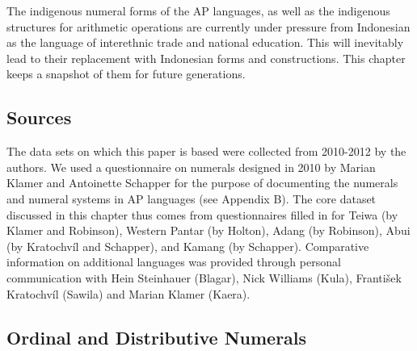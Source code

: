 The indigenous numeral forms of the AP languages, as well as the indigenous structures for arithmetic operations are currently under pressure from Indonesian as the language of interethnic trade and national education. This will inevitably lead to their replacement with Indonesian forms and constructions. This chapter keeps a snapshot of them for future generations. 

\subsection{Sources}
\label{sec:8:Sources}
The data sets on which this paper is based were collected from 2010-2012 by the authors. We used a questionnaire on numerals designed in 2010 by Marian Klamer and Antoinette Schapper for the purpose of documenting the numerals and numeral systems in AP languages (see Appendix B). The core dataset discussed in this chapter thus comes from questionnaires filled in for Teiwa (by Klamer and Robinson), Western Pantar (by Holton), Adang (by Robinson), Abui (by Kratochv\'il and Schapper), and Kamang (by Schapper). Comparative information on additional languages was provided through personal communication with Hein Steinhauer (Blagar), Nick Williams (Kula), Franti{\v{s}}ek Kratochv\'il (Sawila) and Marian Klamer (Kaera).

\startappendix
\subsection{Ordinal and Distributive Numerals} 

